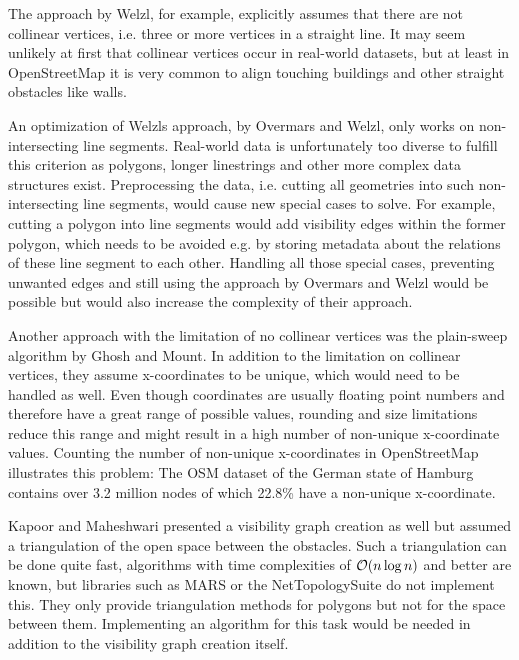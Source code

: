 		The approach by Welzl\cite{welzl-visibility-graph}, for example, explicitly assumes that there are not collinear vertices, i.e. three or more vertices in a straight line.
		It may seem unlikely at first that collinear vertices occur in real-world datasets, but at least in OpenStreetMap it is very common to align touching buildings and other straight obstacles like walls.
		
		An optimization of Welzls approach, by Overmars and Welzl\cite{overmars-weizl-visibility-graph}, only works on non-intersecting line segments.
		Real-world data is unfortunately too diverse to fulfill this criterion as polygons, longer linestrings and other more complex data structures exist.
		Preprocessing the data, i.e. cutting all geometries into such non-intersecting line segments, would cause new special cases to solve.
		For example, cutting a polygon into line segments would add visibility edges within the former polygon, which needs to be avoided e.g. by storing metadata about the relations of these line segment to each other.
		Handling all those special cases, preventing unwanted edges and still using the approach by Overmars and Welzl would be possible but would also increase the complexity of their approach.
		
		Another approach with the limitation of no collinear vertices was the plain-sweep algorithm by Ghosh and Mount\cite{ghosh-output-sensitive-vgraph}.
		In addition to the limitation on collinear vertices, they assume x-coordinates to be unique, which would need to be handled as well.
		Even though coordinates are usually floating point numbers and therefore have a great range of possible values, rounding and size limitations reduce this range and might result in a high number of non-unique x-coordinate values.
		Counting the number of non-unique x-coordinates in OpenStreetMap illustrates this problem:
		The OSM dataset of the German state of Hamburg contains over 3.2 million nodes of which 22.8\% have a non-unique x-coordinate.
		
		Kapoor and Maheshwari presented a visibility graph creation as well\cite{kapoor-shortest-path-vgraph} but assumed a triangulation of the open space between the obstacles.
		Such a triangulation can be done quite fast, algorithms with time complexities of $\mathcal{O}(n \log{n})$ and better are known\cite[58-60]{de-berg-computational-geometry}, but libraries such as MARS or the NetTopologySuite do not implement this.
		They only provide triangulation methods for polygons but not for the space between them.
		Implementing an algorithm for this task would be needed in addition to the visibility graph creation itself.
		
